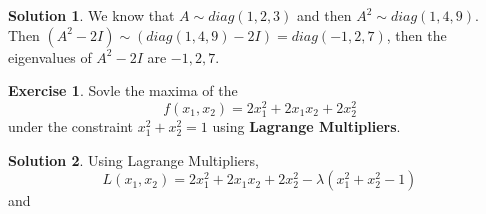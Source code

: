 \documentclass{article}
\theoremstyle{definition}
\newtheorem{exe}{Exercise}[section]
\newtheorem{sol}{Solution}[exe]
\begin{document}
\begin{sol}
    We know that $A\sim diag(1,2,3)$ and then $A^{2}\sim diag(1,4,9)$.
    Then $(A^{2}-2I)\sim (diag(1,4,9)-2I)=diag(-1,2,7)$, then the eigenvalues 
    of $A^{2}-2I$ are $-1,2,7$.
\end{sol}

\begin{exe}
    Sovle the maxima of the $$f(x_{1},x_{2})=2x_{1}^{2}+2x_{1}x_{2}+2x_{2}^{2}$$
    under the constraint $x_{1}^{2}+x_{2}^{2}=1$ using \textbf{Lagrange Multipliers}.
\end{exe}

\begin{sol}
    Using Lagrange Multipliers,
    $$L(x_{1},x_{2})=2x_{1}^{2}+2x_{1}x_{2}+2x_{2}^{2}-\lambda(x_{1}^{2}+x_{2}^{2}-1)$$
    and 
    $$$$
\end{sol}
\end{document}
